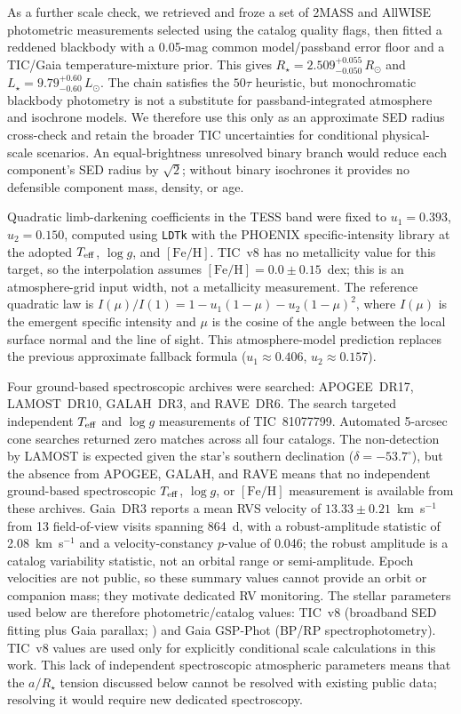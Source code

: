 \documentclass[11pt]{article}
\begin{document}
As a further scale check, we retrieved and froze a set of 2MASS and AllWISE
photometric measurements selected using the catalog quality flags, then fitted a reddened
blackbody with a 0.05-mag common
model/passband error floor and a TIC/Gaia temperature-mixture prior.  This
gives $R_\star=2.509^{+0.055}_{-0.050}\,R_\odot$ and
$L_\star=9.79^{+0.60}_{-0.60}\,L_\odot$.  The chain satisfies the
$50\tau$ heuristic, but monochromatic blackbody photometry is not a substitute
for passband-integrated atmosphere and isochrone models.  We therefore use
this only as an approximate SED radius cross-check and retain the broader TIC
uncertainties for conditional physical-scale scenarios.  An equal-brightness unresolved
binary branch would reduce each component's SED radius by $\sqrt{2}$; without
binary isochrones it provides no defensible component mass, density, or age.

Quadratic limb-darkening coefficients in the TESS band were fixed to
$u_1 = 0.393$, $u_2 = 0.150$, computed using \texttt{LDTk}
\citep{Parviainen2015} with the PHOENIX specific-intensity library
\citep{Husser2013} at the adopted $T_{\rm eff}$, $\log g$, and
$[\mathrm{Fe}/\mathrm{H}]$.  TIC~v8 has no metallicity value for this target,
so the interpolation assumes $[\mathrm{Fe}/\mathrm{H}]=0.0\pm0.15$~dex; this
is an atmosphere-grid input width, not a metallicity measurement.
The reference quadratic law is
$I(\mu)/I(1)=1-u_1(1-\mu)-u_2(1-\mu)^2$, where $I(\mu)$ is the emergent
specific intensity and $\mu$ is the cosine of the angle between the local
surface normal and the line of sight.
This atmosphere-model prediction replaces the previous approximate fallback formula
($u_1 \approx 0.406$, $u_2 \approx 0.157$).

Four ground-based spectroscopic archives were searched: APOGEE~DR17,
LAMOST~DR10, GALAH~DR3, and RAVE~DR6.  The search targeted independent
$T_{\rm eff}$ and $\log g$ measurements of TIC~81077799.  Automated
5-arcsec cone searches returned zero matches across all four catalogs.  The
non-detection by LAMOST is expected given the
star's southern declination ($\delta = -53.7^\circ$), but the absence from
APOGEE, GALAH, and RAVE means that no independent ground-based spectroscopic
$T_{\rm eff}$, $\log g$, or $[\mathrm{Fe}/\mathrm{H}]$ measurement is available
from these archives.
Gaia~DR3 reports a mean RVS velocity of $13.33\pm0.21$~km~s$^{-1}$ from
13 field-of-view visits spanning 864~d, with a robust-amplitude statistic of
2.08~km~s$^{-1}$ and a velocity-constancy $p$-value of 0.046; the robust
amplitude is a catalog variability statistic, not an orbital range or
semi-amplitude.  Epoch
velocities are not public, so these summary values cannot provide an orbit
or companion mass; they motivate dedicated RV monitoring.  The stellar parameters
used below are therefore photometric/catalog values: TIC~v8 (broadband SED
fitting plus Gaia parallax; \citealt{Stassun2019}) and Gaia GSP-Phot (BP/RP
spectrophotometry).  TIC~v8 values are used only for explicitly conditional
scale calculations in this work.  This lack of independent spectroscopic atmospheric parameters
means that the $a/R_\star$ tension discussed below cannot be resolved with
existing public data; resolving it would require new dedicated spectroscopy.
\end{document}
